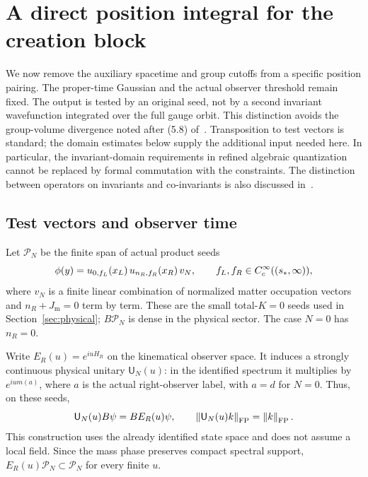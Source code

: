 \section{A direct position integral for the creation block}
\label{sec:position}
We now remove the auxiliary spacetime and group cutoffs from a specific
position pairing. The proper-time Gaussian and the actual observer
threshold remain fixed. The output is tested by an original seed, not
by a second invariant wavefunction integrated over the full gauge orbit.
This distinction avoids the group-volume divergence noted after
(5.8) of~\cite{KL}. Transposition to test vectors is standard; the
domain estimates below supply the additional input needed here.
In particular, the invariant-domain requirements in
refined algebraic quantization~\cite[Section II]{GM} cannot be replaced
by formal commutation with the constraints. The distinction between
operators on invariants and co-invariants is also discussed
in~\cite[Section 5.1]{HM}.

\subsection{Test vectors and observer time}
Let $\mathcal P_N$ be the finite span of actual product seeds
\begin{equation}
 \phi(y)=u_{0,f_L}(x_L)\,u_{n_R,f_R}(x_R)\,v_N,
 \qquad f_L,f_R\in C_c^\infty((s_*,\infty)),
 \label{eq:position-seeds}
\end{equation}
where $v_N$ is a finite linear combination of normalized matter occupation
vectors and $n_R+J_{\mathrm m}=0$ term by term. These are the small
total-$K=0$ seeds used in Section~\ref{sec:physical}; $B\mathcal P_N$
is dense in the physical sector. The case $N=0$ has $n_R=0$.

Write $E_R(u)=e^{iuH_R}$ on the kinematical observer space. It induces
a strongly continuous physical unitary $\mathsf U_N(u)$:
in the identified spectrum it multiplies by $e^{iu m(a)}$, where
$a$ is the actual right-observer label, with $a=d$ for $N=0$.
Thus, on these seeds,
\begin{equation}
 \mathsf U_N(u)B\psi=B E_R(u)\psi,\qquad
 \left\lVert\mathsf U_N(u)k\right\rVert_{\mathrm{FP}}=\left\lVert k\right\rVert_{\mathrm{FP}}.
 \label{eq:physical-observer-time}
\end{equation}
This construction uses the already identified state space and does not
assume a local field. Since the mass phase preserves compact spectral
support, $E_R(u)\mathcal P_N\subset\mathcal P_N$ for every finite $u$.

